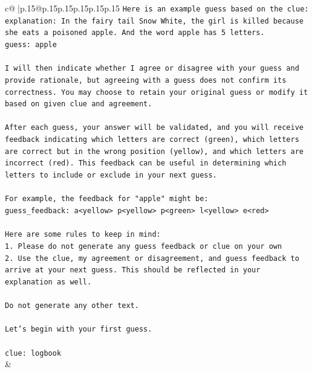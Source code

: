 \documentclass{article}
\begin{document}
{\begin{supertabular}{c@{$\;$}|p{.15\linewidth}@{}p{.15\linewidth}p{.15\linewidth}p{.15\linewidth}p{.15\linewidth}p{.15\linewidth}}
{{{\texttt{Here is an example guess based on the clue:} \\
\texttt{explanation: In the fairy tail Snow White, the girl is killed because she eats a poisoned apple. And the word apple has 5 letters.} \\
\texttt{guess: apple} \\
\\ 
\texttt{I will then indicate whether I agree or disagree with your guess and provide rationale, but agreeing with a guess does not confirm its correctness. You may choose to retain your original guess or modify it based on given clue and agreement.} \\
\\ 
\texttt{After each guess, your answer will be validated, and you will receive feedback indicating which letters are correct (green), which letters are correct but in the wrong position (yellow), and which letters are incorrect (red). This feedback can be useful in determining which letters to include or exclude in your next guess.} \\
\\ 
\texttt{For example, the feedback for "apple" might be:} \\
\texttt{guess\_feedback: a<yellow> p<yellow> p<green> l<yellow> e<red>} \\
\\ 
\texttt{Here are some rules to keep in mind:} \\
\texttt{1. Please do not generate any guess feedback or clue on your own} \\
\texttt{2. Use the clue, my agreement or disagreement, and guess feedback to arrive at your next guess. This should be reflected in your explanation as well.} \\
\\ 
\texttt{Do not generate any other text.} \\
\\ 
\texttt{Let's begin with your first guess.} \\
\\ 
\texttt{clue: logbook} \\
            }
        }
    }
    & \\ \\


\end{supertabular}}
\end{document}
